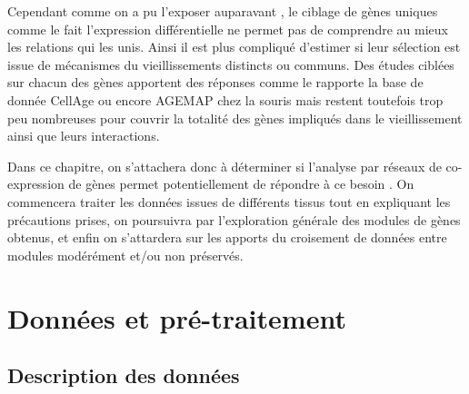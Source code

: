 Cependant comme on a pu l'exposer auparavant , le ciblage de gènes uniques comme le fait l'expression différentielle ne permet pas de comprendre au mieux les relations qui les unis. Ainsi il est plus compliqué d'estimer si leur sélection est issue de mécanismes du vieillissements distincts ou communs. Des études ciblées sur chacun des gènes apportent des réponses comme le rapporte la base de donnée CellAge \cite{Avelar2019} ou encore AGEMAP chez la souris \cite{Zahn2007} mais restent toutefois trop peu nombreuses pour couvrir la totalité des gènes impliqués dans le vieillissement ainsi que leurs interactions. 

Dans ce chapitre, on s'attachera donc à déterminer si l'analyse par réseaux de co-expression de gènes permet potentiellement de répondre à ce besoin . On commencera traiter les données issues de différents tissus tout en expliquant les précautions prises, on poursuivra par l'exploration générale des modules de gènes obtenus, et enfin on s'attardera sur les apports du croisement de données entre modules modérément et/ou non préservés. 




\section{Données et pré-traitement}

\subsection{Description des données}

